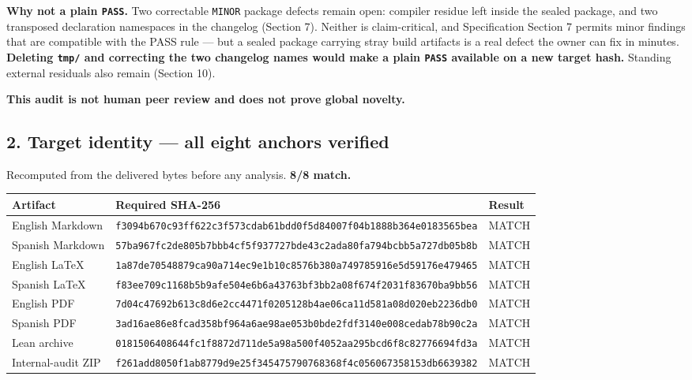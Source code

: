 \documentclass[
  9pt,
  a4paper,
]{article}
\newcounter{none} %
\begin{document}
\textbf{Why not a plain \texttt{PASS}.} Two correctable \texttt{MINOR}
package defects remain open: compiler residue left inside the sealed
package, and two transposed declaration namespaces in the changelog
(Section 7). Neither is claim-critical, and Specification Section 7
permits minor findings that are compatible with the PASS rule --- but a
sealed package carrying stray build artifacts is a real defect the owner
can fix in minutes. \textbf{Deleting \texttt{tmp/} and correcting the
two changelog names would make a plain \texttt{PASS} available on a new
target hash.} Standing external residuals also remain (Section 10).

\textbf{This audit is not human peer review and does not prove global
novelty.}

\subsection{2. Target identity --- all eight anchors
verified}\label{2-target-identity--all-eight-anchors-verified}

Recomputed from the delivered bytes before any analysis. \textbf{8/8
match.}

{\def\LTcaptype{none} %
\begin{longtable}[]{@{}lll@{}}
\toprule\noalign{}
Artifact & Required SHA-256 & Result \\
\midrule\noalign{}
\endhead
\bottomrule\noalign{}
\endlastfoot
English Markdown &
\texttt{f3094b670c93ff622c3f573cdab61bdd0f5d84007f04b1888b364e0183565bea}
& MATCH \\
Spanish Markdown &
\texttt{57ba967fc2de805b7bbb4cf5f937727bde43c2ada80fa794bcbb5a727db05b8b}
& MATCH \\
English LaTeX &
\texttt{1a87de70548879ca90a714ec9e1b10c8576b380a749785916e5d59176e479465}
& MATCH \\
Spanish LaTeX &
\texttt{f83ee709c1168b5b9afe504e6b6a43763bf3bb2a08f674f2031f83670ba9bb56}
& MATCH \\
English PDF &
\texttt{7d04c47692b613c8d6e2cc4471f0205128b4ae06ca11d581a08d020eb2236db0}
& MATCH \\
Spanish PDF &
\texttt{3ad16ae86e8fcad358bf964a6ae98ae053b0bde2fdf3140e008cedab78b90c2a}
& MATCH \\
Lean archive &
\texttt{0181506408644fc1f8872d711de5a98a500f4052aa295bcd6f8c82776694fd3a}
& MATCH \\
Internal-audit ZIP &
\texttt{f261add8050f1ab8779d9e25f345475790768368f4c056067358153db6639382}
& MATCH \\
\end{longtable}
}
\end{document}
